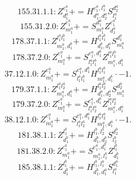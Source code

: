 \documentclass[letterpaper,10pt,fleqn,leqno,onecolumn]{article}
\begin{document}
\begin{equation} \;\;\;\;\;\;  155.31.1.1: Z^{e_{1}^{a}}_{d_{1}^{a}}+=H^{e_{1}^{a},l_{1}^{a}}_{d_{1}^{a},d_{2}^{a}}S^{d_{2}^{a}}_{l_{1}^{a}} \end{equation}
\begin{equation} \;\;\;\;\;\;  155.31.2.0: Z^{e_{1}^{a}}_{m_{1}^{a}}+=S^{d_{1}^{a}}_{m_{1}^{a}}Z^{e_{1}^{a}}_{d_{1}^{a}} \end{equation}
\begin{equation} \;\;\;\;\;\;  178.37.1.1: Z^{l_{1}^{a}l_{1}^{b}}_{m_{1}^{a},d_{1}^{b}}+=H^{l_{1}^{a}l_{1}^{b}}_{d_{1}^{b},d_{1}^{a}}S^{d_{1}^{a}}_{m_{1}^{a}} \end{equation}
\begin{equation} \;\;\;\;\;\;  178.37.2.0: Z^{e_{1}^{a}}_{m_{1}^{a}}+=S^{e_{1}^{a},d_{1}^{b}}_{l_{1}^{a}l_{1}^{b}}Z^{l_{1}^{a}l_{1}^{b}}_{m_{1}^{a},d_{1}^{b}} \end{equation}
\begin{equation} \;\;\;\;\;\;  37.12.1.0: Z^{e_{1}^{a}}_{m_{1}^{a}}+=S^{e_{1}^{a},d_{1}^{b}}_{l_{1}^{a}l_{1}^{b}}H^{l_{1}^{a}l_{1}^{b}}_{m_{1}^{a},d_{1}^{b}}\cdot -1. \end{equation}
\begin{equation} \;\;\;\;\;\;  179.37.1.1: Z^{l_{1}^{a}l_{2}^{a}}_{m_{1}^{a},d_{1}^{a}}+=H^{l_{1}^{a}l_{2}^{a}}_{d_{1}^{a},d_{2}^{a}}S^{d_{2}^{a}}_{m_{1}^{a}} \end{equation}
\begin{equation} \;\;\;\;\;\;  179.37.2.0: Z^{e_{1}^{a}}_{m_{1}^{a}}+=S^{e_{1}^{a},d_{1}^{a}}_{l_{1}^{a}l_{2}^{a}}Z^{l_{1}^{a}l_{2}^{a}}_{m_{1}^{a},d_{1}^{a}} \end{equation}
\begin{equation} \;\;\;\;\;\;  38.12.1.0: Z^{e_{1}^{a}}_{m_{1}^{a}}+=S^{e_{1}^{a},d_{1}^{a}}_{l_{1}^{a}l_{2}^{a}}H^{l_{1}^{a}l_{2}^{a}}_{m_{1}^{a},d_{1}^{a}}\cdot -1. \end{equation}
\begin{equation} \;\;\;\;\;\;  181.38.1.1: Z^{l_{1}^{b}}_{d_{1}^{b}}+=H^{l_{1}^{b},l_{2}^{b}}_{d_{1}^{b},d_{2}^{b}}S^{d_{2}^{b}}_{l_{2}^{b}} \end{equation}
\begin{equation} \;\;\;\;\;\;  181.38.2.0: Z^{e_{1}^{a}}_{m_{1}^{a}}+=S^{e_{1}^{a},d_{1}^{b}}_{m_{1}^{a},l_{1}^{b}}Z^{l_{1}^{b}}_{d_{1}^{b}} \end{equation}
\begin{equation} \;\;\;\;\;\;  185.38.1.1: Z^{l_{1}^{b}}_{d_{1}^{b}}+=H^{l_{1}^{b},l_{1}^{a}}_{d_{1}^{b},d_{1}^{a}}S^{d_{1}^{a}}_{l_{1}^{a}} \end{equation}
\end{document}
